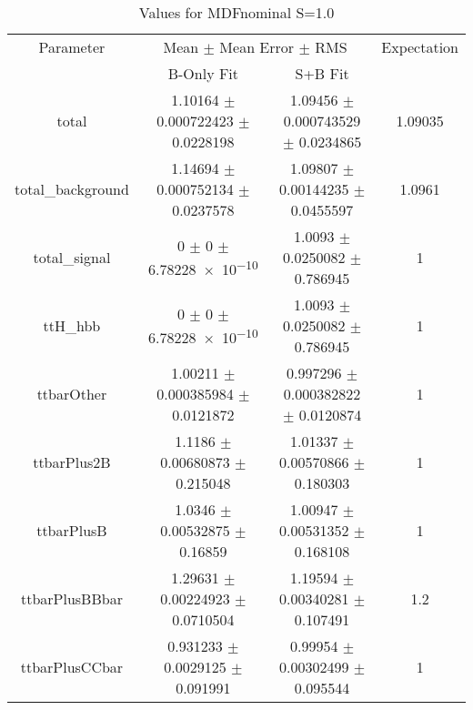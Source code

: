 \begin{table}
\centering
\caption{Values for MDFnominal S=1.0}
\begin{tabular}{cccc}
\toprule
Parameter & \multicolumn{2}{c}{Mean $\pm$ Mean Error $\pm$ RMS} & Expectation\\
 & B-Only Fit & S+B Fit & \\
\midrule
total & \num{1.10164} $\pm$ \num{0.000722423} $\pm$ \num{0.0228198} & \num{1.09456} $\pm$ \num{0.000743529} $\pm$ \num{0.0234865} & \num{1.09035}\\
total\_background & \num{1.14694} $\pm$ \num{0.000752134} $\pm$ \num{0.0237578} & \num{1.09807} $\pm$ \num{0.00144235} $\pm$ \num{0.0455597} & \num{1.0961}\\
total\_signal & \num{0} $\pm$ \num{0} $\pm$ \num{6.78228e-10} & \num{1.0093} $\pm$ \num{0.0250082} $\pm$ \num{0.786945} & \num{1}\\
ttH\_hbb & \num{0} $\pm$ \num{0} $\pm$ \num{6.78228e-10} & \num{1.0093} $\pm$ \num{0.0250082} $\pm$ \num{0.786945} & \num{1}\\
ttbarOther & \num{1.00211} $\pm$ \num{0.000385984} $\pm$ \num{0.0121872} & \num{0.997296} $\pm$ \num{0.000382822} $\pm$ \num{0.0120874} & \num{1}\\
ttbarPlus2B & \num{1.1186} $\pm$ \num{0.00680873} $\pm$ \num{0.215048} & \num{1.01337} $\pm$ \num{0.00570866} $\pm$ \num{0.180303} & \num{1}\\
ttbarPlusB & \num{1.0346} $\pm$ \num{0.00532875} $\pm$ \num{0.16859} & \num{1.00947} $\pm$ \num{0.00531352} $\pm$ \num{0.168108} & \num{1}\\
ttbarPlusBBbar & \num{1.29631} $\pm$ \num{0.00224923} $\pm$ \num{0.0710504} & \num{1.19594} $\pm$ \num{0.00340281} $\pm$ \num{0.107491} & \num{1.2}\\
ttbarPlusCCbar & \num{0.931233} $\pm$ \num{0.0029125} $\pm$ \num{0.091991} & \num{0.99954} $\pm$ \num{0.00302499} $\pm$ \num{0.095544} & \num{1}\\
\bottomrule
\end{tabular}
\end{table}